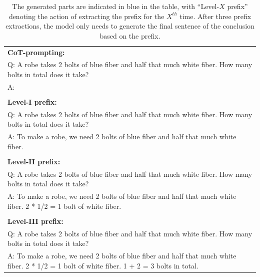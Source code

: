 \begin{table}[thp]
    \setlength{\abovecaptionskip}{0.1cm}
    \caption{The generated parts are indicated in \color{blue}blue \color{black}in the table, with ``Level-$X$ prefix'' denoting the action of extracting the prefix for the $X^{th}$ time. After three prefix extractions, the model only needs to generate the final sentence of the conclusion based on the prefix.}
    \label{tab:path-consistency}
    \centering
    \small
    \begin{tabularx}{0.95\columnwidth}{@{}X@{}}
        \toprule
        
        \textbf{CoT-prompting:} \\
        Q: A robe takes 2 bolts of blue fiber and half that much white fiber. How many bolts in total does it take? \\
        A: \color{blue}{To make a robe, we need 2 bolts of blue fiber and half that much white fiber. We can write this as 2 + 1/2 * 2. Now 1/2 * 2 = 1, so the equation becomes 2 + 1 = 3. The answer is 3.} \\\\
        
        \textbf{Level-I prefix:} \\
        Q: A robe takes 2 bolts of blue fiber and half that much white fiber. How many bolts in total does it take? \\ 
        A: To make a robe, we need 2 bolts of blue fiber and half that much white fiber. \color{blue}{2 * 1/2 = 1 bolt of white fiber. 2 + 1 = 3 bolts in total. The answer is 3.} \\\\
        
        \textbf{Level-II prefix:} \\
        Q: A robe takes 2 bolts of blue fiber and half that much white fiber. How many bolts in total does it take? \\ 
        A: To make a robe, we need 2 bolts of blue fiber and half that much white fiber. 2 * 1/2 = 1 bolt of white fiber. \color{blue}{1 + 2 = 3 bolts in total. The answer is 3.} \\\\        
        \textbf{Level-III prefix:} \\
        Q: A robe takes 2 bolts of blue fiber and half that much white fiber. How many bolts in total does it take? \\ 
        A: To make a robe, we need 2 bolts of blue fiber and half that much white fiber. 2 * 1/2 = 1 bolt of white fiber. 1 + 2 = 3 bolts in total. \color{blue}{The answer is 3.} \\ \bottomrule
    \end{tabularx}
\end{table}

